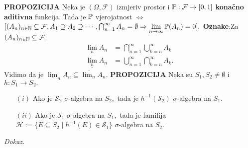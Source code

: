 \documentclass{article}
\begin{document}
\textbf{PROPOZICIJA}\newline
Neka je \((\Omega,\mathcal F)\) izmjeriv prostor i \(\Bbb P:\mathcal F\to[0,1]\) \textbf{konačno aditivna} funkcija. Tada je \(\Bbb P\) vjerojatnost \(\Leftrightarrow\) \([(A_n)_{n\in\Bbb N}\subseteq\mathcal F,A_1\supseteq A_2\supseteq\cdots,\bigcap_{n=1}^\infty A_n=\emptyset\Rightarrow\lim\limits_{n\to\infty}\Bbb P(A_n)=0].\)\newline\newline
\textbf{Oznake}:\newline Za \((A_n)_{n\in\Bbb N}\subseteq\mathcal F,\) \[\begin{aligned}\overline{\lim_n}A_n&=\bigcap_{n=1}^\infty\bigcup_{k=n}^\infty A_k\\\underline{\lim_n}A_n&=\bigcup_{n=1}^\infty\bigcap_{k=n}^\infty A_k.\end{aligned}\] Vidimo da je \(\underline{\lim}_nA_n\subseteq\overline{\lim_n}A_n.\)
\newpage
\textbf{PROPOZICIJA}\newline 
Neka su \(S_1,S_2\ne\emptyset\) i \(h:S_1\to S_2.\)
\begin{enumerate}
    \item[\((i)\)] Ako je \(\mathcal S_2\) \(\sigma\)-algebra na \(S_2,\) tada je \(h^{-1}(\mathcal S_2)\) \(\sigma\)-algebra na \(S_1.\)
    \item[\((ii)\)] Ako je \(\mathcal S_1\) \(\sigma\)-algebra na \(S_1,\) tada je familija \(\mathcal H:=\{E\subseteq S_2\mid h^{-1}(E)\in\mathcal S_1\}\) \(\sigma\)-algebra na \(S_2.\)
\end{enumerate}
\textit{Dokaz.}
\end{document}
